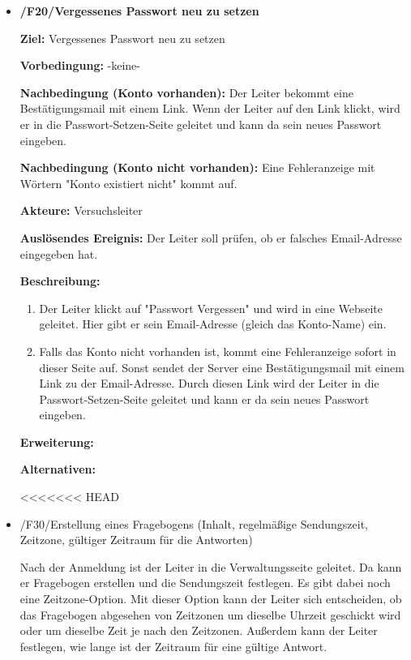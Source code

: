 \documentclass[a4paper]{scrreprt}
\begin{document}
\begin{itemize}
	            \item \textbf{/F20/Vergessenes Passwort neu zu setzen}
	            
	            \par \textbf{Ziel: }Vergessenes Passwort neu zu setzen
	            \par \textbf{Vorbedingung: }-keine-
	            \par \textbf{Nachbedingung (Konto vorhanden): }Der Leiter bekommt eine Bestätigungsmail mit einem Link. Wenn der Leiter auf den Link klickt, wird er in die Passwort-Setzen-Seite geleitet und kann da sein neues Passwort eingeben.
	            \par \textbf{Nachbedingung (Konto nicht vorhanden): }Eine Fehleranzeige mit Wörtern "Konto existiert nicht" kommt auf.
	            \par \textbf{Akteure: }Versuchsleiter
	            \par \textbf{Auslösendes Ereignis: }Der Leiter soll prüfen, ob er falsches Email-Adresse eingegeben hat.
	            \par \textbf{Beschreibung: }
	            \begin{enumerate}
	            	\item Der Leiter klickt auf "Passwort Vergessen" und wird in eine Webseite geleitet. Hier gibt er sein Email-Adresse (gleich das Konto-Name) ein.
	            	\item Falls das Konto nicht vorhanden ist, kommt eine Fehleranzeige sofort in dieser Seite auf. Sonst sendet der Server eine Bestätigungsmail mit einem Link zu der Email-Adresse. Durch diesen Link wird der Leiter in die Passwort-Setzen-Seite geleitet und kann er da sein neues Passwort eingeben.
	            \end{enumerate}
	            \par \textbf{Erweiterung: }
	            \par \textbf{Alternativen: }

<<<<<<< HEAD
	            \item /F30/Erstellung eines Fragebogens (Inhalt, regelmäßige Sendungszeit, Zeitzone, gültiger Zeitraum für die Antworten)
	            	\par Nach der Anmeldung ist der Leiter in die Verwaltungsseite geleitet. Da kann er Fragebogen erstellen und die Sendungszeit festlegen. Es gibt dabei noch eine Zeitzone-Option. Mit dieser Option kann der Leiter sich entscheiden, ob das Fragebogen abgesehen von Zeitzonen um dieselbe Uhrzeit geschickt wird oder um dieselbe Zeit je nach den Zeitzonen. Außerdem kann der Leiter festlegen, wie lange ist der Zeitraum für eine gültige Antwort.
	            	

\end{itemize}
\end{document}
